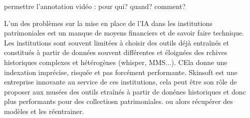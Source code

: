 \begin{itemize}
	permettre l'annotation vidéo : pour qui? quand? comment? 
	
	L'un des problèmes sur la mise en place de l'IA dans les institutions patrimoniales est un manque de moyens financiers et de savoir faire technique. Les institutions sont souvent limitées à choisir des outils déjà entraînés et constitués à partir de données souvent différentes et éloignées des rchives historiques complexes et hétérogènes (whisper, MMS...). CEla donne une indexation imprécise, risquée et pas forcément performante. Skinsoft est une entreprise innovante au service de ces institutions, cela peut être son rôle de proposer aux musées des outils etraînés à partir de donénes historiques et donc plus performants pour des collectiosn patrimoniales. ou alors récupérer des modèles et les réentrainer. 
	
\end{itemize}